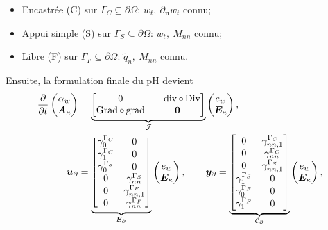 \begin{itemize}
\item Encastrée (C) sur $ \Gamma_{C} \subseteq \partial \Omega $: $ w_t, \ \partial_{\bm{n}} {w_t} $ connu;
\item Appui simple (S) sur $ \Gamma_{S} \subseteq \partial\Omega $: $ w_t, \ M_{nn} $ connu;
\item Libre (F) sur $ \Gamma_{F} \subseteq \partial \Omega $: $ \widetilde {q}_n, \ M_{nn} $ connu.
\end{itemize}
Ensuite, la formulation finale du pH devient
\begin{equation*}
\begin{aligned}
\displaystyle
\diffp{}{t}
\begin{pmatrix}
\alpha_w \\
\bm{A}_{\kappa} \\
\end{pmatrix} &= 
\underbrace{\begin{bmatrix}
	0  &  - \div \circ \Div \\
	\Grad \circ \grad & \bm{0} \\
	\end{bmatrix}}_{\mathcal{J}}
\begin{pmatrix}
e_w \\
\bm{E}_{\kappa} \\
\end{pmatrix}, \vspace{3pt}\\
\bm{u}_\partial &= \underbrace{
	\begin{bmatrix}
	\gamma_{0}^{\Gamma_C} & {0}  \\
	\gamma_1^{\Gamma_C} &  {0} \\
	\gamma_{0}^{\Gamma_S} &  {0}  \\
	{0} & \gamma_{nn}^{\Gamma_S} \\
	{0} & \gamma_{nn, 1}^{\Gamma_F}  \\
	{0} & \gamma_{nn}^{\Gamma_F}\\
	\end{bmatrix}}_{\mathcal{B}_\partial} \begin{pmatrix}
e_w \\
\bm{E}_{\kappa} \\
\end{pmatrix},\qquad
\bm{y}_\partial = \underbrace{
	\begin{bmatrix}
	{0} & \gamma_{nn, 1}^{\Gamma_C} \\
	{0} & \gamma_{nn}^{\Gamma_C} \\
	{0} & \gamma_{nn, 1}^{\Gamma_S} \\
	\gamma_{1}^{\Gamma_S} & {0} \\
	\gamma_{0}^{\Gamma_F} & {0} \\
	\gamma_{1}^{\Gamma_F} & {0} \\
	\end{bmatrix}}_{\mathcal{C}_\partial}
\begin{pmatrix}
e_w \\
\bm{E}_{\kappa} \\
\end{pmatrix},
\end{aligned}
\end{equation*}
